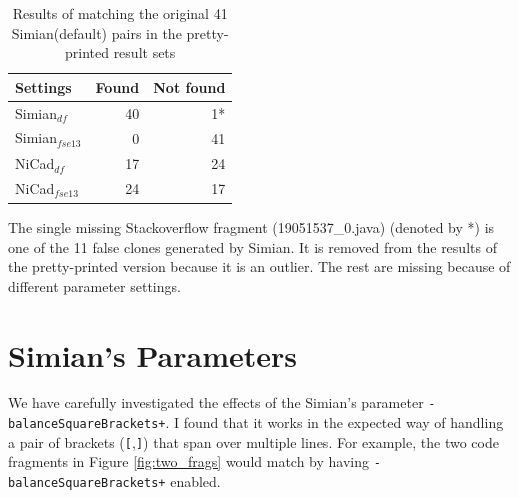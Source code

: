 \documentclass{IEEEtran}
\begin{document}
\begin{table}[H]
	\centering
	\caption{Results of matching the original 41 Simian(default) pairs in the pretty-printed result sets}
	\label{tab:search}
	\begin{tabular}{l|r|r}
		\hline 
		Settings & Found & Not found \\ 
		\hline 
		Simian$_{df}$  &  40 & 1* \\ 
		\hline 
		Simian$_{\mathrm{\textit{fse13}}}$ & 0 & 41  \\ 
		\hline 
		NiCad$_{df}$  & 17 & 24 \\ 
		\hline 
		NiCad$_{\mathrm{\textit{fse13}}}$ &  24 & 17 \\ 
		\hline 
	\end{tabular} 
\end{table}

The single missing Stackoverflow fragment (19051537\_0.java) (denoted by *) is one of the 11 false clones generated by Simian. It is removed from the results of the pretty-printed version because it is an outlier. The rest are missing because of different parameter settings.

\section*{Simian's Parameters}

We have carefully investigated the effects of the Simian's parameter \texttt{-balanceSquareBrackets+}. I found that it works in the expected way of handling a pair of brackets (\texttt{[},\texttt{]}) that span over multiple lines. For example, the two code fragments in Figure \ref{fig:two_frags} would match by having \texttt{-balanceSquareBrackets+} enabled.
\end{document}
